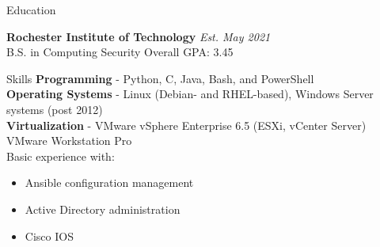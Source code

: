 \documentclass{resume} %
\begin{document}

\begin{rSection}{Education}

{\bf Rochester Institute of Technology} \hfill {\em Est. May 2021} \\ 
B.S. in Computing Security
Overall GPA: 3.45

\end{rSection}


\begin{rSection}{Skills}
    {\bf Programming} - Python, C, Java, Bash, and PowerShell \\
    {\bf Operating Systems} - Linux (Debian- and RHEL-based), Windows Server
    systems (post 2012) \\
    {\bf Virtualization} - VMware vSphere Enterprise 6.5 (ESXi, vCenter Server)
    VMware Workstation Pro \\
    Basic experience with:
    \begin{itemize}
        \item Ansible configuration management
        \item Active Directory administration
        \item Cisco IOS
    \end{itemize}

\end{rSection}

\end{document}
